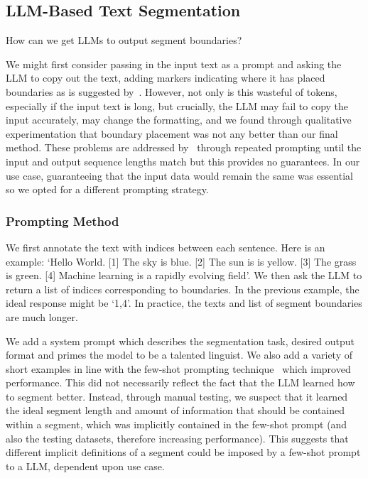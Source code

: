 
\subsection{LLM-Based Text Segmentation}\label{LLM-Based Text Segmentation}


How can we get LLMs to output segment boundaries?

We might first consider passing in the input text as a prompt and asking the LLM to copy out the text, adding markers indicating where it has placed boundaries as is suggested by~\citep{XingThesis}. However, not only is this wasteful of tokens, especially if the input text is long, but crucially, the LLM may fail to copy the input accurately, may change the formatting, and we found through qualitative experimentation that boundary placement was not any better than our final method. These problems are addressed by~\citep{XingThesis} through repeated prompting until the input and output sequence lengths match but this provides no guarantees. In our use case, guaranteeing that the input data would remain the same was essential so we opted for a different prompting strategy.

\subsubsection{Prompting Method}

We first annotate the text with indices between each sentence. Here is an example: `Hello World. [1] The sky is blue. [2] The sun is is yellow. [3] The grass is green. [4] Machine learning is a rapidly evolving field'. We then ask the LLM to return a list of indices corresponding to boundaries. In the previous example, the ideal response might be `1,4'. In practice, the texts and list of segment boundaries are much longer.

We add a system prompt which describes the segmentation task, desired output format and primes the model to be a talented linguist. We also add a variety of short examples in line with the few-shot prompting technique~\citep{FewShotLearners} which improved performance. This did not necessarily reflect the fact that the LLM learned how to segment better. Instead, through manual testing, we suspect that it learned the ideal segment length and amount of information that should be contained within a segment, which was implicitly contained in the few-shot prompt (and also the testing datasets, therefore increasing performance). This suggests that different implicit definitions of a segment could be imposed by a few-shot prompt to a LLM, dependent upon use case.


